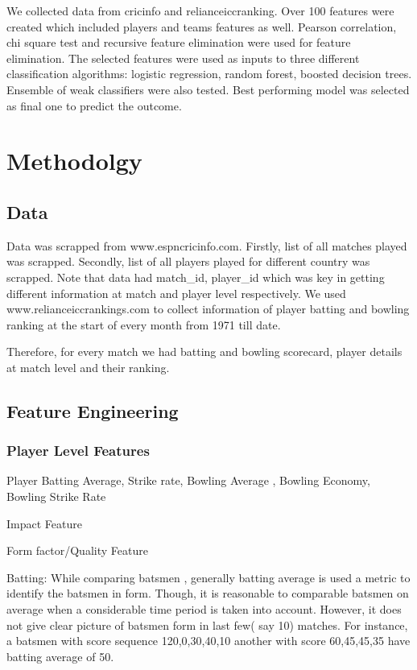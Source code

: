 \documentclass[a4paper]{article}
\begin{document}
We collected data from cricinfo and relianceiccranking. Over 100 features were created which included players and teams features as well.  Pearson correlation, chi square test and recursive feature elimination were used for feature elimination. The selected features were used as inputs to three different classification algorithms: logistic regression,
random forest, boosted decision trees. Ensemble of weak classifiers were also tested. Best performing model was selected as final one to predict the outcome.


\section{Methodolgy}

\subsection{Data}

Data was scrapped from www.espncricinfo.com. Firstly, list of all matches played was scrapped. Secondly, list of all players played for different country was scrapped. Note that data had match\_id, player\_id which was key in getting different information
at match and player level respectively. We used www.relianceiccrankings.com to collect information of player batting and bowling ranking at the start of every month from 1971 till date. 

Therefore, for every match we had batting and bowling scorecard, player details at match level and their ranking. 



\subsection{Feature Engineering}
\subsubsection{
Player Level Features
}

Player Batting Average, Strike rate, Bowling Average , Bowling Economy, Bowling Strike Rate 

Impact Feature

Form factor/Quality Feature


Batting:
While comparing batsmen , generally batting average is used a metric to identify the batsmen in form. Though, it is reasonable to comparable batsmen on average when a considerable time period is taken into account. However, it does not give clear picture of batsmen form in last few( say 10) matches. For instance, a batsmen with score sequence  120,0,30,40,10  another with score 60,45,45,35 have batting average of 50. 
\end{document}
